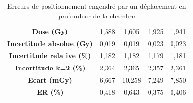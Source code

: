 \documentclass{article}
\begin{document}
\begin{table}[h]
\begin{tabular}{c|cc|cc|}
  \multicolumn{1}{|c|}{\textbf{Dose (Gy)}}                 & 1,588           & 1,605          & 1,925           & 1,941           \\
  \multicolumn{1}{|c|}{\textbf{Incertitude absolue (Gy)}}  & 0,019           & 0,019          & 0,023           & 0,023           \\
  \multicolumn{1}{|c|}{\textbf{Incertitude relative (\%)}} & 1,182           & 1,182          & 1,179           & 1,181           \\
  \multicolumn{1}{|c|}{\textbf{Incertitude k=2 (\%)}}      & 2,364           & 2,365          & 2,357           & 2,361           \\
  \multicolumn{1}{|c|}{\textbf{Ecart (mGy)}}               & 6,667           & 10,258         & 7,249           & 7,850           \\
  \multicolumn{1}{|c|}{\textbf{ER (\%)}}                   & 0,418           & 0,643          & 0,375           & 0,406           \\ \hline
  \end{tabular}
  \caption{Erreurs de positionnement engendré par un déplacement en profondeur de la chambre}
  \label{table_erreur_profondeur}
\end{table}


\clearpage


\nocite{*}
\end{document}
